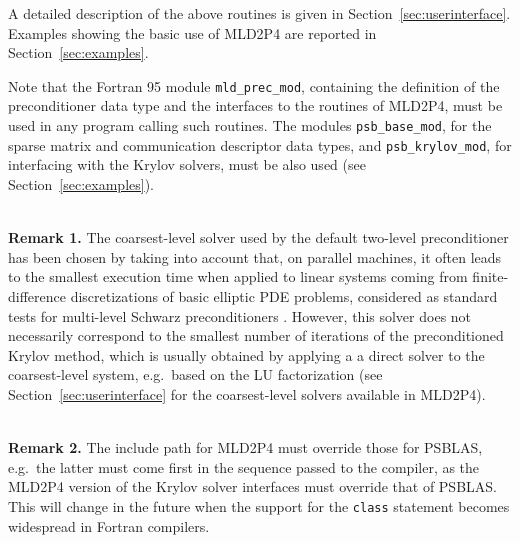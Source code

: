 A detailed description of the above routines is given in Section~\ref{sec:userinterface}.
Examples showing the basic use of MLD2P4 are reported in Section~\ref{sec:examples}.

Note that the Fortran 95 module \verb|mld_prec_mod|, containing the definition of the 
preconditioner data type and the interfaces to the routines of MLD2P4,
must be used in any program calling such routines.
The modules \verb|psb_base_mod|, for the sparse matrix and communication descriptor
data types, and \verb|psb_krylov_mod|, for interfacing with the
Krylov solvers, must be also used (see Section~\ref{sec:examples}).

\ \\
\textbf{Remark 1.} The coarsest-level solver used by the default two-level
preconditioner has been chosen by taking into account that, on parallel
machines, it often leads to the smallest execution time when applied to
linear systems coming from finite-difference discretizations of basic
elliptic PDE problems, considered as standard tests for multi-level Schwarz
preconditioners \cite{aaecc_07,apnum_07}. However, this solver does
not necessarily correspond to the smallest number of iterations of the
preconditioned Krylov method, which is usually obtained by applying a
a direct solver to the coarsest-level system, e.g.\ based on the LU
factorization (see Section~\ref{sec:userinterface}
for the coarsest-level solvers available in MLD2P4). 

\ \\
\textbf{Remark 2.} The include path for MLD2P4 must override
those for PSBLAS, e.g.\ the latter must come first in the sequence
passed to the compiler, as the MLD2P4 version of the Krylov solver
interfaces must override that of PSBLAS. This will change in the future
when the support for the \verb|class| statement becomes widespread in Fortran
compilers. 


